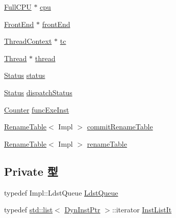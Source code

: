 \begin{DoxyCompactItemize}
\hyperlink{classBackEnd_a90ba84e54618cc07f2e8f05e046cb5ce}{FullCPU} $\ast$ \hyperlink{classBackEnd_a766385c2941cd46525f4d9dff90200a2}{cpu}
\item 
\hyperlink{classFrontEnd}{FrontEnd} $\ast$ \hyperlink{classBackEnd_a67c762418bb2017cb2dce5a0c94f0788}{frontEnd}
\item 
\hyperlink{classThreadContext}{ThreadContext} $\ast$ \hyperlink{classBackEnd_a4455a4759e69e5ebe68ae7298cbcc37d}{tc}
\item 
\hyperlink{structOzoneThreadState}{Thread} $\ast$ \hyperlink{classBackEnd_a743989b66f3b52f1eda2a8498a93da0b}{thread}
\item 
\hyperlink{classBackEnd_a67a0db04d321a74b7e7fcfd3f1a3f70b}{Status} \hyperlink{classBackEnd_ae29aa2d4ae440022daaed1107eb306b3}{status}
\item 
\hyperlink{classBackEnd_a67a0db04d321a74b7e7fcfd3f1a3f70b}{Status} \hyperlink{classBackEnd_a245e3bace7ab490110304d56450aba64}{dispatchStatus}
\item 
\hyperlink{base_2types_8hh_ae1475755791765b8e6f6a8bb091e273e}{Counter} \hyperlink{classBackEnd_a344acde4f72898017365be79fd18a323}{funcExeInst}
\item 
\hyperlink{classRenameTable}{RenameTable}$<$ Impl $>$ \hyperlink{classBackEnd_adbf41f9b1f8e58747002bd5f65f2ded9}{commitRenameTable}
\item 
\hyperlink{classRenameTable}{RenameTable}$<$ Impl $>$ \hyperlink{classBackEnd_af8d3f859e7c0dd9408ba99de6f415616}{renameTable}
\end{DoxyCompactItemize}
\subsection*{Private 型}
\begin{DoxyCompactItemize}
\item 
typedef Impl::LdstQueue \hyperlink{classBackEnd_a4c90230ea80fdcedea6e4fb9b43009cd}{LdstQueue}
\item 
typedef \hyperlink{classstd_1_1list}{std::list}$<$ \hyperlink{classBackEnd_a028ce10889c5f6450239d9e9a7347976}{DynInstPtr} $>$::iterator \hyperlink{classBackEnd_a4da46d72d68fcd5bfe65dc701c358379}{InstListIt}
\end{DoxyCompactItemize}
